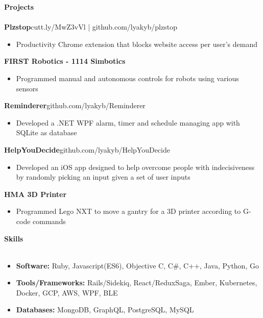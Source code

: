 \documentclass[a4paper]{article}
\newcommand{\lineunder} {
    \vspace{-8pt} \\
    \hspace{-18pt} \hrulefill \\
}
\newcommand{\header} [1] {
    {\hspace{-18pt}\vspace*{6pt} \textcolor{headerGray}{\textbf{\large{#1}}}}
    \vspace{-6pt} \lineunder
}
\begin{document}
\header{Projects}
{\textbf{\normalsize Plzstop}}\hfill \textcolor{dateGray}{cutt.ly/MwZ3vVl      |      github.com/lyakyb/plzstop}\\
\vspace{-2mm}
\begin{itemize}[leftmargin= 1cm]\itemsep -0.5pt
	\item Productivity Chrome extension that blocks website access per user's demand
\end{itemize}
\vspace{-1mm}
{\textbf{\normalsize FIRST Robotics - 1114 Simbotics}}\\
\vspace{-2mm}
\begin{itemize}[leftmargin=1cm ]\itemsep -0.5pt
	\item Programmed manual and autonomous controls for robots using various sensors
\end{itemize}
\vspace{-1mm}
{\textbf{\normalsize Reminderer}}\hfill \textcolor{dateGray}{github.com/lyakyb/Reminderer}\\
\vspace{-2mm}
\begin{itemize}[leftmargin=1cm ]\itemsep -0.5pt
	\item Developed a .NET WPF alarm, timer and schedule managing app with SQLite as database
\end{itemize}
\vspace{-1mm}
{\textbf{\normalsize HelpYouDecide}}\hfill \textcolor{dateGray}{github.com/lyakyb/HelpYouDecide}\\
\vspace{-2mm}
\begin{itemize}[leftmargin=1cm ]\itemsep -0.5pt
	\item Developed an iOS app designed to help overcome people with indecisiveness by randomly picking an input given a set of user inputs
\end{itemize}
{\textbf{\normalsize HMA 3D Printer}}\\
\vspace{-2.5mm}
\begin{itemize}[leftmargin=1cm ]\itemsep -0.5pt
	\item Programmed Lego NXT to move a gantry for a 3D printer according to G-code commands
\end{itemize}
\vspace{1mm}

\header{Skills}
\vspace{-2.5mm}
\begin{itemize}[leftmargin=*]\itemsep -0.5pt
	\item \textbf{Software: } Ruby, Javascript(ES6), Objective C, C\#, C++, Java, Python, Go\\
	\item \textbf{Tools/Frameworks: } Rails/Sidekiq, React/ReduxSaga, Ember, Kubernetes, Docker, GCP, AWS, WPF, BLE\\
	\item \textbf{Databases: } MongoDB, GraphQL, PostgreSQL, MySQL
\end{itemize}
\end{document}
